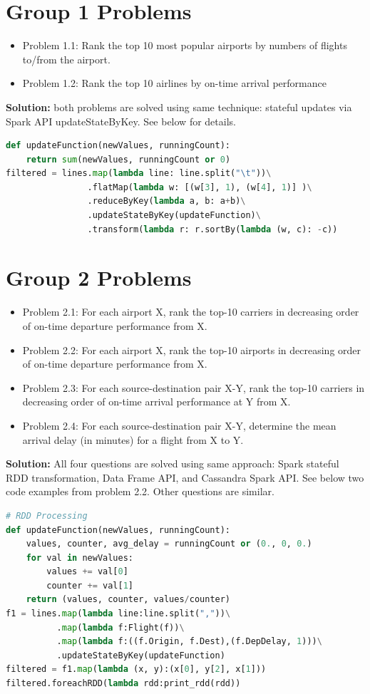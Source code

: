 \documentclass[fontsize=11pt,paper=a4]{scrartcl}
\begin{document}
\section{Group 1 Problems} 
\begin{itemize} 
\item Problem 1.1: Rank the top 10 most popular airports by numbers of flights to/from the airport.
\item Problem 1.2: Rank the top 10 airlines by on-time arrival performance
\end{itemize}
\textbf{Solution:} both problems are solved using same technique: stateful updates via Spark API updateStateByKey. See below for details. 
\begin{lstlisting}[basicstyle=\small,language = python] 
def updateFunction(newValues, runningCount):
    return sum(newValues, runningCount or 0)
filtered = lines.map(lambda line: line.split("\t"))\
                .flatMap(lambda w: [(w[3], 1), (w[4], 1)] )\
                .reduceByKey(lambda a, b: a+b)\
                .updateStateByKey(updateFunction)\
                .transform(lambda r: r.sortBy(lambda (w, c): -c))
\end{lstlisting}

 
\section{Group 2 Problems}
\begin{itemize} 
\item Problem 2.1: For each airport X, rank the top-10 carriers in decreasing order of on-time departure performance from X. 
\item Problem 2.2: For each airport X, rank the top-10 airports in decreasing order of on-time departure performance from X.
\item Problem 2.3: For each source-destination pair X-Y, rank the top-10 carriers in decreasing order of on-time arrival performance at Y from X.
\item Problem 2.4: For each source-destination pair X-Y, determine the mean arrival delay (in minutes) for a flight from X to Y.
\end{itemize}
\textbf{Solution:} All four questions are solved using same approach: Spark stateful RDD transformation, Data Frame API, and Cassandra Spark API. See below two code examples from problem 2.2. Other questions are similar. 
\begin{lstlisting}[basicstyle=\small,language = python] 
# RDD Processing
def updateFunction(newValues, runningCount):
    values, counter, avg_delay = runningCount or (0., 0, 0.)
    for val in newValues: 
        values += val[0]
        counter += val[1]
    return (values, counter, values/counter) 
f1 = lines.map(lambda line:line.split(","))\
          .map(lambda f:Flight(f))\
          .map(lambda f:((f.Origin, f.Dest),(f.DepDelay, 1)))\
          .updateStateByKey(updateFunction)
filtered = f1.map(lambda (x, y):(x[0], y[2], x[1]))
filtered.foreachRDD(lambda rdd:print_rdd(rdd))
\end{lstlisting}
\end{document}
